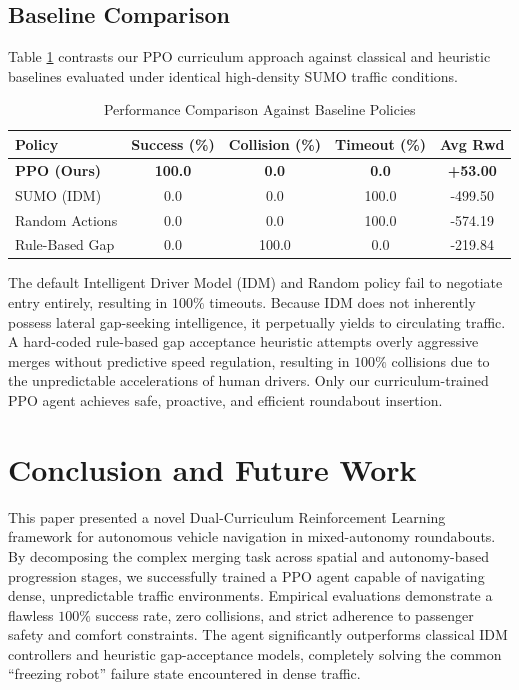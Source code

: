 \documentclass[conference]{IEEEtran}
\begin{document}
\subsection{Baseline Comparison}
Table \ref{tab:baselines} contrasts our PPO curriculum approach against classical and heuristic baselines evaluated under identical high-density SUMO traffic conditions.

\begin{table}[htbp]
\centering
\caption{Performance Comparison Against Baseline Policies}
\label{tab:baselines}
\begin{tabular}{@{}lcccc@{}}
\toprule
\textbf{Policy} & \textbf{Success (\%)} & \textbf{Collision (\%)} & \textbf{Timeout (\%)} & \textbf{Avg Rwd} \\ \midrule
\textbf{PPO (Ours)} & \textbf{100.0} & \textbf{0.0} & \textbf{0.0} & \textbf{+53.00} \\
SUMO (IDM) & 0.0 & 0.0 & 100.0 & -499.50 \\
Random Actions & 0.0 & 0.0 & 100.0 & -574.19 \\
Rule-Based Gap & 0.0 & 100.0 & 0.0 & -219.84 \\ \bottomrule
\end{tabular}
\end{table}

The default Intelligent Driver Model (IDM) and Random policy fail to negotiate entry entirely, resulting in $100\%$ timeouts. Because IDM does not inherently possess lateral gap-seeking intelligence, it perpetually yields to circulating traffic. A hard-coded rule-based gap acceptance heuristic attempts overly aggressive merges without predictive speed regulation, resulting in $100\%$ collisions due to the unpredictable accelerations of human drivers. Only our curriculum-trained PPO agent achieves safe, proactive, and efficient roundabout insertion.

\section{Conclusion and Future Work}
This paper presented a novel Dual-Curriculum Reinforcement Learning framework for autonomous vehicle navigation in mixed-autonomy roundabouts. By decomposing the complex merging task across spatial and autonomy-based progression stages, we successfully trained a PPO agent capable of navigating dense, unpredictable traffic environments. Empirical evaluations demonstrate a flawless $100\%$ success rate, zero collisions, and strict adherence to passenger safety and comfort constraints. The agent significantly outperforms classical IDM controllers and heuristic gap-acceptance models, completely solving the common ``freezing robot'' failure state encountered in dense traffic.
\end{document}
